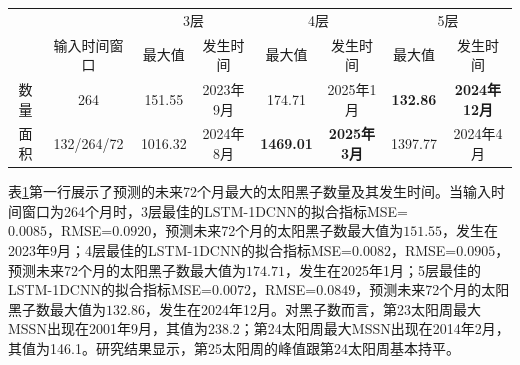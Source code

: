 \begin{table}[!htbp]
\centering
{}
\label{tab:ss_out_72}
\footnotesize
\begin{tabular}{cccccccc}
    \toprule
    &  & \multicolumn{2}{c}{3层} & \multicolumn{2}{c}{4层} & \multicolumn{2}{c}{5层}\\
    \cmidrule(lr){3-4} \cmidrule(lr){5-6} \cmidrule(lr){7-8}
    \noalign{\smallskip}
     & 输入时间窗口 & 最大值 & 发生时间 & 最大值 & 发生时间 & 最大值 & 发生时间 \\
    \midrule
    数量 & 264 & 151.55 & 2023年9月 & 174.71 & 2025年1月 & \textbf{132.86} & \textbf{2024年12月} \\
    面积 & 132/264/72 & 1016.32 & 2024年8月 & \textbf{1469.01} & \textbf{2025年3月} & 1397.77 & 2024年4月 \\
    \bottomrule
  \end{tabular}
\end{table}

表\ref{tab:ss_out_72}第一行展示了预测的未来72个月最大的太阳黑子数量及其发生时间。当输入时间窗口为264个月时，3层最佳的LSTM-1DCNN的拟合指标MSE=\\$0.0085$，RMSE=$0.0920$，预测未来72个月的太阳黑子数最大值为$151.55$，发生在2023年9月；4层最佳的LSTM-1DCNN的拟合指标MSE=$0.0082$，RMSE=$0.0905$，预测未来72个月的太阳黑子数最大值为$174.71$，发生在2025年1月；5层最佳的LSTM-1DCNN的拟合指标MSE=$0.0072$，RMSE=$0.0849$，预测未来72个月的太阳黑子数最大值为$132.86$，发生在2024年12月。对黑子数而言，第23太阳周最大MSSN出现在2001年9月，其值为238.2；第24太阳周最大MSSN出现在2014年2月，其值为146.1。研究结果显示，第25太阳周的峰值跟第24太阳周基本持平。 

